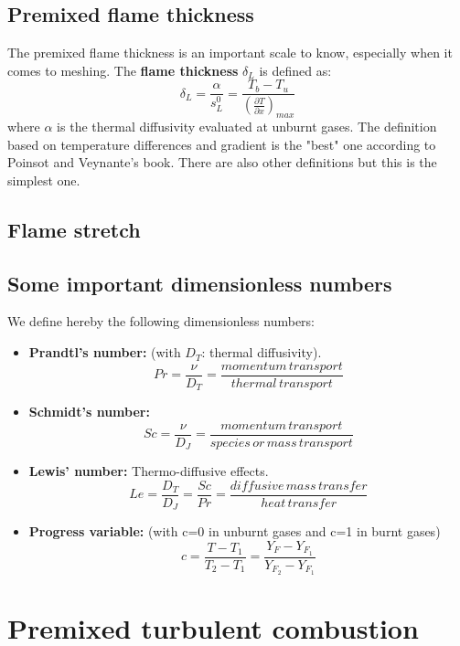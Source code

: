 \documentclass[a4paper,11pt]{article}
\begin{document}
\subsection{Premixed flame thickness}
The premixed flame thickness is an important scale to know, especially when it comes to meshing. The \textbf{flame thickness} $\delta_L$ is defined as: 
\[ \delta_L = \frac{\alpha}{s^0_L} = \frac{T_b-T_u}{(\frac{\partial T}{\partial x})_{max}}\]
where $\alpha$ is the thermal diffusivity evaluated at unburnt gases. The definition based on temperature differences and gradient is the "best" one according to Poinsot and Veynante's book. There are also other definitions but this is the simplest one.
\subsection{Flame stretch}

\subsection{Some important dimensionless numbers}
We define hereby the following dimensionless numbers:
\begin{itemize}
	\item \textbf{Prandtl's number:} (with $D_T$: thermal diffusivity).
	\[Pr = \frac{\nu}{D_T}=\frac{momentum \, transport}{thermal \, transport}\]
	\item \textbf{Schmidt's number:} 
	\[Sc=\frac{\nu}{D_J}=\frac{momentum \, transport}{species \, or \, mass \, transport}\]
	\item \textbf{Lewis' number:} Thermo-diffusive effects.
	\[Le=\frac{D_T}{D_J} = \frac{Sc}{Pr} = \frac{diffusive \, mass \, transfer}{heat \, transfer}\]
	\item \textbf{Progress variable:} (with c=0 in unburnt gases and c=1 in burnt gases)
	\[c = \frac{T-T_1}{T_2 - T_1} = \frac{Y_F - Y_{F_1}}{Y_{F_2}-Y_{F_1}}\]
\end{itemize}
\pagebreak
\section{Premixed turbulent combustion}
\end{document}
